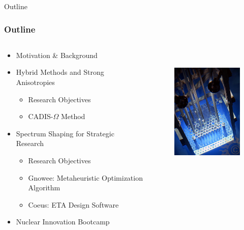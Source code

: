 \documentclass[xcolor=x11names,compress]{beamer}
\renewcommand{\(}{\begin{columns}}
\renewcommand{\)}{\end{columns}}
\newcommand{\<}[1]{\begin{column}{#1}}
\renewcommand{\>}{\end{column}}
\begin{document}
\begin{frame}[fragile]{Outline}
  \frametitle{Outline}

\begin{columns}
  \begin{column}{0.5\textwidth}
    \begin{itemize}
    \item Motivation \& Background
    \vspace*{.5em}
    \item Hybrid Methods and Strong Anisotropies
        \begin{itemize}
        \item Research Objectives
	\item CADIS-$\Omega$ Method
        \end{itemize}
        
   \vspace*{.5em}
   \item Spectrum Shaping for Strategic Research
        \begin{itemize}
        \item Research Objectives
	\item Gnowee: Metaheuristic Optimization Algorithm
	\item Coeus: ETA Design Software
        \end{itemize}	
  \item Nuclear Innovation Bootcamp
  \end{itemize}
  \end{column}
  \begin{column}{0.5\textwidth}
  	\begin{figure}
  	\begin{center}
  		\includegraphics[height=2.5in,clip]{../figs/psu-reactor}
	\end{center}
  	\end{figure}
  \end{column}
\end{columns}

\end{frame}
\end{document}
